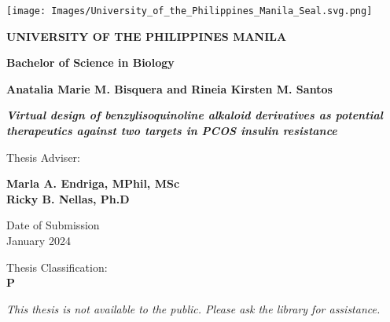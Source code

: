 \thispagestyle{empty}

{\fontsize{12pt}{15pt}\selectfont

\begin{center}

\texttt{[image: Images/University\_of\_the\_Philippines\_Manila\_Seal.svg.png]}

\vspace*{0.2cm}


\noindent\textbf{UNIVERSITY OF THE PHILIPPINES MANILA}

\vspace*{1.5cm}

\noindent\textbf{Bachelor of Science in Biology}

\vspace*{0.2cm}
\noindent\textbf{Anatalia Marie M. Bisquera and Rineia Kirsten M. Santos}

\vspace*{0.2cm}

\noindent\textbf{ \textit{Virtual design of benzylisoquinoline alkaloid derivatives as potential therapeutics against two targets in PCOS insulin resistance}}

\vspace*{2cm}

\noindent Thesis Adviser:

\noindent\textbf{Marla A. Endriga, MPhil, MSc \\ Ricky B. Nellas, Ph.D}

\vspace*{0.2cm}



\vfill

\noindent Date of Submission\\
\vspace*{5pt}
\noindent January 2024

\vspace*{0.75cm}

\noindent Thesis Classification:\\
\vspace*{5pt}
\noindent\textbf{P}

\vspace*{0.5cm}

\noindent\textit{This thesis is not available to the public. Please ask the library for assistance.}

\end{center}
}